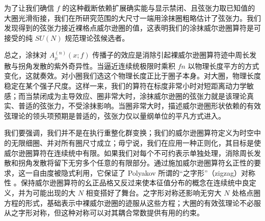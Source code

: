 为了让我们确信 $f$ 的这种截断依赖扩展确实能与显示禁闭、且弦张力取已知值的大圈光滑衔接，我们在所研究范围的大尺寸一端用涂抹圈粗略估计了弦张力。我们发现得到的弦张力接近裸格点威尔逊圈的值，这表明我们的涂抹威尔逊圈算符是可接受的纯 $SU(N)$ 规范理论弦候选者。


总之，涂抹对 $A^{(n)}_\mu (x;f)$ 传播子的效应是消除引起裸威尔逊圈算符迹中周长发散与拐角发散的紫外奇异性。当逼近连续统极限时乘积 $fn$ 以物理长度平方的方式变化，这就奏效。对小圈我们选这个物理长度正比于圈子本身。对大圈，物理长度稳定在某个强子尺度。这样一来，我们的算符在标度非常小时对短距离动力学敏感；而当禁闭成为主导效应、圈非常大时，涂抹威尔逊圈的弦张力就是该理论真实、普适的弦张力，不受涂抹影响。当圈非常大时，描述威尔逊圈形状依赖的有效弦理论的领头项预期是普适的，弦张力仅以量纲单位的平凡方式进入。

我们要强调，我们并不是在执行重整化群变换；我们的威尔逊圈算符定义为时空中的无限细圈、并对所有圈尺寸成立；毋宁说，我们在应用一种正则化，其目标是使威尔逊圈算符在连续统中有限。如果我们对每个不可约表示单独处理，消除周长发散和拐角发散将留下无穷多个任意的有限部分。通过施加威尔逊圈算符幺正性的要求，这一自由度被隐式利用，它保证了 Polyakov 所谓的``之字形''（zigzag）对称性 \cite{poly3}。保持威尔逊圈算符的幺正品格又反过来使本征值分布的概念在连续统中良定义，并为可能出现的大 $N$ 相变搭好了舞台。之字形对称还影响无穷大 $N$ 处格点圈方程的形式，基础表示中裸威尔逊圈的迹服从这些方程；大圈的有效弦理论不必服从之字形对称，但这种对称可以对其耦合常数提供有用的约束。
